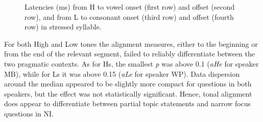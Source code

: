 \begin{figure}
\centering
{}
\caption{Latencies (ms) from H to vowel onset (first row) and offset (second row), and from L to consonant onset (third row) and offset (fourth row) in stressed syllable.}
\label{fig206}\end{figure}

For both High and Low tones the alignment measures, either to the beginning or from the end of the relevant segment, failed to reliably differentiate between the two pragmatic contexts. As for Hs, the smallest \textit{p} was above 0.1 (\textit{aHe} for speaker MB), while for Ls it was above 0.15 (\textit{aLe} for speaker WP). Data dispersion around the median appeared to be slightly more compact for questions in both speakers, but the effect was not statistically significant. Hence, tonal alignment does appear to differentiate between partial topic statements and narrow focus questions in NI.

